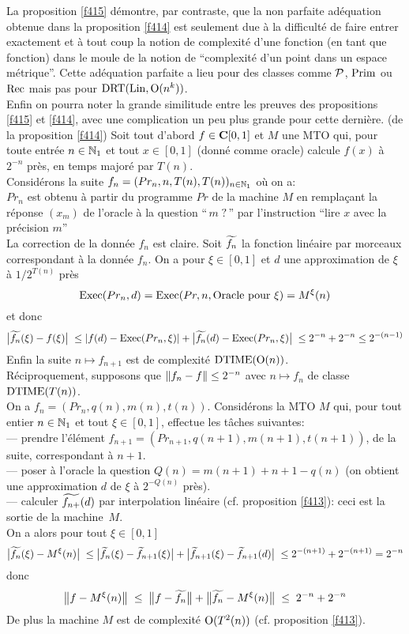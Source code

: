 \medskip La proposition \ref{f415} démontre, par contraste, que la non parfaite adéquation 
obtenue dans la proposition \ref{f414} est seulement due à la difficulté de 
faire entrer exactement et à tout coup la notion de complexité d'une 
fonction \unico (en tant que fonction) dans le moule de la notion de 
``complexité d'un point dans un espace métrique''. Cette adéquation 
parfaite a lieu pour des classes comme  ${\cal P}$, ${\rm Prim} $ ou ${\rm Rec} $ mais pas pour  
${\rm DRT}({\rm Lin}, {\rm O}(n^k))$. \\
Enfin on pourra noter la grande similitude entre les preuves des propositions 
\ref{f415} et \ref{f414}, avec une complication un peu plus grande pour cette 
dernière.   
\sni \proof (de la proposition \ref{f414}) Soit tout d'abord  $f \in {{\bf C}[0,1]}$  et   
$M$  une  MTO  qui, pour toute entrée  $n \in \mathbb {N}_1$  et tout $x \in [0,1]$ 
(donné comme oracle) calcule  $f(x)$ à  $2^{-n}$ près, en temps majoré 
par  $T(n)$. \\
Considérons la suite  $f_n = (Pr_n, n, T(n), T(n))_{n \in \mathbb {N}_1}$ où on 
a:\\
$Pr_n$  est obtenu à partir du programme  $Pr$  de la machine  $M$  en 
rempla\c{c}ant la réponse  $(x_m)$  de l'oracle  à la question  ``$\,m\;?\,$''  
par l'instruction   ``lire  $x$  avec la précision  $m$'' \\ 
La correction de la donnée $f_n$ est claire. Soit  $\widetilde{f_n}$  la 
fonction linéaire par morceaux correspondant à la donnée  $f_n$.  On a  
pour  $\xi \in [0,1]$  et  $d$  une approximation de  $\xi$ à  $1/2^{T(n)}$  
près
$$ {{\rm Exec}}(Pr_n, d) = {{\rm Exec}} (Pr, n, \hbox{Oracle pour } \xi) 
= M^{\xi}(n)$$
et donc
$$\big|{ \widetilde{f_n}(\xi) - f(\xi) }\big|\;  \leq 
\left|{f(d) - {{\rm Exec}}(Pr_n, \xi) }\right| + \big|{ \widetilde{f_n}(d) - {{\rm Exec}} (Pr_n, \xi) }\big|\;  \leq 2^{-n} + 2^{-n} \leq 2^{-(n-1)}$$ 
Enfin la suite  $n \mapsto f_{n+1}$  est de complexité  ${\rm DTIME} ({\rm O}(n))$.\\
Réciproquement, supposons que  $\lVert  f_n - f \rVert  \leq 2^{-n}$  avec    
$n \mapsto f_n$   de classe  ${\rm DTIME} (T(n))$. \\
On a  $f_n = (Pr_n, q(n), m(n), t(n))$. Considérons la MTO  $M$ qui, pour tout 
entier  $n \in \mathbb {N}_1$ et tout  $\xi \in [0,1]$, effectue les tâches 
suivantes: \\
--- prendre l'élément  $f_{n+1} = (Pr_{n+1}, q(n+1), m(n+1), t(n+1))$, de la 
suite, correspondant à  $n+1$. \\
--- poser à l'oracle la question  $Q(n) = m(n+1) + n+1 - q(n)$  (on obtient 
une approximation  $d$  de  $\xi$ à $2^{-Q(n)}$ près). \\
--- calculer  $\widetilde{f_{n+}}(d)$ par interpolation linéaire (cf. 
proposition \ref{f413}): ceci est la sortie de la machine~$M$.\\   
On a alors pour tout $ \xi \in [0,1]$
\[
\big|{\widetilde{f_n}(\xi) - M^{\xi}(n) }\big|\;  \leq 
\big|{\widetilde{f}_n(\xi) - \widetilde{f}_{n+1}(\xi)}\big| + 
\big|{\widetilde{f}_{n+1}(\xi) - \widetilde{f}_{n+1}(d) }\big|\;  
\leq 2^{-(n+1)} + 2^{-(n+1)} = 2^{-n}  
\] 
donc 
\[
\big\lVert  f - M^{\xi}(n) \big\rVert \; \leq\;  \big\lVert  f - \widetilde{f_n} \big\rVert + 
\big\lVert  \widetilde{f_n} - M^{\xi}(n)  \big\rVert 
\; \leq\;  2^{-n} + 2^{-n}
\]
De plus la machine  $M$ est de complexité ${\rm O}(T^2(n))$ (cf. proposition 
\ref{f413}).\eop

